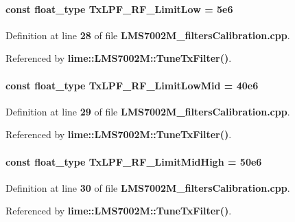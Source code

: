 \paragraph[{Tx\+L\+P\+F\+\_\+\+R\+F\+\_\+\+Limit\+Low}]{\setlength{\rightskip}{0pt plus 5cm}const {\bf float\+\_\+type} Tx\+L\+P\+F\+\_\+\+R\+F\+\_\+\+Limit\+Low = 5e6}\label{LMS7002M__filtersCalibration_8cpp_a41b5f1e72a489822ffaf4e499c7b9154}


Definition at line {\bf 28} of file {\bf L\+M\+S7002\+M\+\_\+filters\+Calibration.\+cpp}.



Referenced by {\bf lime\+::\+L\+M\+S7002\+M\+::\+Tune\+Tx\+Filter()}.

\paragraph[{Tx\+L\+P\+F\+\_\+\+R\+F\+\_\+\+Limit\+Low\+Mid}]{\setlength{\rightskip}{0pt plus 5cm}const {\bf float\+\_\+type} Tx\+L\+P\+F\+\_\+\+R\+F\+\_\+\+Limit\+Low\+Mid = 40e6}\label{LMS7002M__filtersCalibration_8cpp_ad60dd3989e72e40be2270ae4be4f277d}


Definition at line {\bf 29} of file {\bf L\+M\+S7002\+M\+\_\+filters\+Calibration.\+cpp}.



Referenced by {\bf lime\+::\+L\+M\+S7002\+M\+::\+Tune\+Tx\+Filter()}.

\paragraph[{Tx\+L\+P\+F\+\_\+\+R\+F\+\_\+\+Limit\+Mid\+High}]{\setlength{\rightskip}{0pt plus 5cm}const {\bf float\+\_\+type} Tx\+L\+P\+F\+\_\+\+R\+F\+\_\+\+Limit\+Mid\+High = 50e6}\label{LMS7002M__filtersCalibration_8cpp_a8b82d455baafae9bb1da212cae9cff71}


Definition at line {\bf 30} of file {\bf L\+M\+S7002\+M\+\_\+filters\+Calibration.\+cpp}.



Referenced by {\bf lime\+::\+L\+M\+S7002\+M\+::\+Tune\+Tx\+Filter()}.

